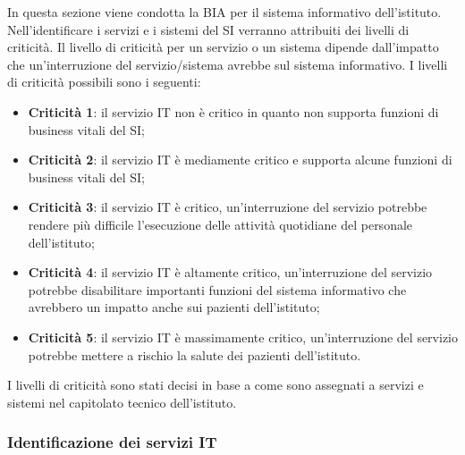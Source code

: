 \documentclass[12pt, a4paper, titlepage]{report}
\begin{document}
		In questa sezione viene condotta la BIA per il sistema informativo dell'istituto. Nell'identificare i servizi e i sistemi del SI verranno attribuiti dei livelli di criticità. Il livello di criticità per un servizio o un sistema dipende dall'impatto che un'interruzione del servizio/sistema avrebbe sul sistema informativo. I livelli di criticità possibili sono i seguenti:
		\begin{itemize}
			\item \textbf{Criticità 1}: il servizio IT non è critico in quanto non supporta funzioni di business vitali del SI;
			\item \textbf{Criticità 2}: il servizio IT è mediamente critico e supporta alcune funzioni di business vitali del SI;
			\item \textbf{Criticità 3}: il servizio IT è critico, un'interruzione del servizio potrebbe rendere più difficile l'esecuzione delle attività quotidiane del personale dell'istituto;
			\item \textbf{Criticità 4}: il servizio IT è altamente critico, un'interruzione del servizio potrebbe disabilitare importanti funzioni del sistema informativo che avrebbero un impatto anche sui pazienti dell'istituto;
			\item \textbf{Criticità 5}: il servizio IT è massimamente critico, un'interruzione del servizio potrebbe mettere a rischio la salute dei pazienti dell'istituto.
		\end{itemize}
		I livelli di criticità sono stati decisi in base a come sono assegnati a servizi e sistemi nel capitolato tecnico dell'istituto.
		
		\subsubsection{Identificazione dei servizi IT}
		
\end{document}
